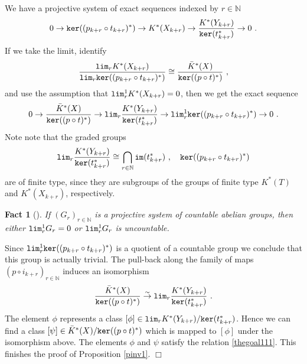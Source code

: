 \documentclass[12pt]{article}
\newtheorem{fact}[theorem]{Fact}
\newcommand{\im}{{\tt im}}
\renewcommand{\ker}{{\tt ker}}
\def\hB{\hspace*{\fill}$\Box$ \newline\noindent}
\newcommand{\nat}{{\mathbb{N}}}
\renewcommand{\lim}{{\tt lim}}
\begin{document}
 
We have a projective system of exact sequences indexed by $r\in \nat$
$$0\to \ker((p_{k+r}\circ t_{k+r})^{*})\to K^{*}(X_{k+r}) \to  
\frac{K^{*}(Y_{k+r})}{\ker(t^{*}_{k+r})}\to 0\ .$$ If we take the limit, 
identify
$$\frac{\lim_{r} K^{*}(X_{k+r})}{\lim_{r} \ker((p_{k+r}\circ t_{k+r})^{*})}\cong  \frac{\bar K^{*}(X)}{\ker((p\circ t)^{*})}\ ,$$
and use the assumption that $\lim^{1}_{r} K^{*}(X_{k+r})=0$, then
we get the exact sequence
$$0\to  \frac{\bar K^{*}(X)}{\ker((p\circ t)^{*})}  \to \lim_{r}\frac{K^{*}(Y_{k+r})}{\ker(t^{*}_{k+r})}
\to \lim_{r}^{1}  \ker((p_{k+r}\circ t_{k+r})^{*}) \to 0\ .$$
Note note that the graded groups
$$\lim_{r}\frac{K^{*}(Y_{k+r})}{\ker(t^{*}_{k+r})}\cong \bigcap_{r\in \nat} \im(t_{k+r}^{*}) \ , \quad   \ker((p_{k+r}\circ t_{k+r})^{*})$$  are of  finite type, since they are subgroups of the groups of finite type $K^{*}(T)$ and $K^{*}(X_{k+r})$, respectively.
\begin{fact}[\cite{gray}] If $(G_{r})_{r\in \nat}$ is a projective system of countable abelian groups, then either
$\lim_{r}^{1} G_{r}=0$ or $\lim_{r}^{1}G_{r}$ is uncountable.  
\end{fact} 
Since 
$\lim_{r}^{1}  \ker((p_{k+r}\circ t_{k+r})^{*})$ is a quotient of a countable group 
we conclude that  this group is actually trivial.
The pull-back along the family of maps $(p\circ i_{k+r})_{r\in \nat}$ induces an  isomorphism
 $$\frac{\bar K^{*}(X)}{\ker((p\circ t)^{*})}  \stackrel{\sim}{\to}  \lim_{r}\frac{K^{*}(Y_{k+r})}{\ker(t^{*}_{k+r})}\ .$$
 The element $\phi$ represents a class  
$[\phi]\in \lim_{r}K^{*}(Y_{k+r})/\ker(t^{*}_{k+r})$. Hence we can find a class
$[\psi ]\in \bar K^{*}(X)/\ker((p\circ t)^{*})$ which is mapped to $[\phi]$ under the isomorphism above. The elements $\phi$ and $\psi$ satisfy the relation \eqref{thegoal111}.
 This finishes the proof of Proposition \ref{pinv1}.
\hB 


 
 
 
 
 
%
%
%
% 
%
\end{document}
